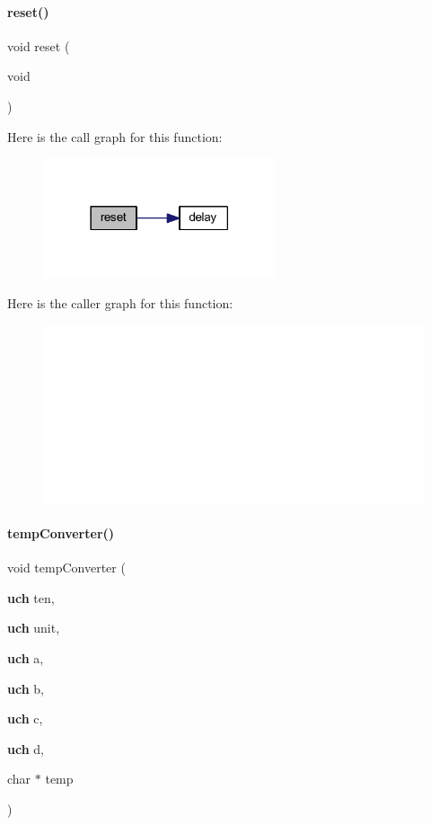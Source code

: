 \paragraph{reset()}
{\footnotesize\ttfamily void reset (\begin{DoxyParamCaption}\item[{void}]{ }\end{DoxyParamCaption})}

Here is the call graph for this function\+:
\nopagebreak
\begin{figure}[H]
\begin{center}
\leavevmode
\includegraphics[width=194pt]{a00050_a3aea9deb2a0bfea9ff05a898f4822e31_cgraph}
\end{center}
\end{figure}
Here is the caller graph for this function\+:
\nopagebreak
\begin{figure}[H]
\begin{center}
\leavevmode
\includegraphics[width=350pt]{a00050_a3aea9deb2a0bfea9ff05a898f4822e31_icgraph}
\end{center}
\end{figure}
\mbox{\label{a00050_ae65dc8b271b6a6d9c27ab20193103a88}} 
\paragraph{temp\+Converter()}
{\footnotesize\ttfamily void temp\+Converter (\begin{DoxyParamCaption}\item[{\textbf{ uch}}]{ten,  }\item[{\textbf{ uch}}]{unit,  }\item[{\textbf{ uch}}]{a,  }\item[{\textbf{ uch}}]{b,  }\item[{\textbf{ uch}}]{c,  }\item[{\textbf{ uch}}]{d,  }\item[{char $\ast$}]{temp }\end{DoxyParamCaption})}

